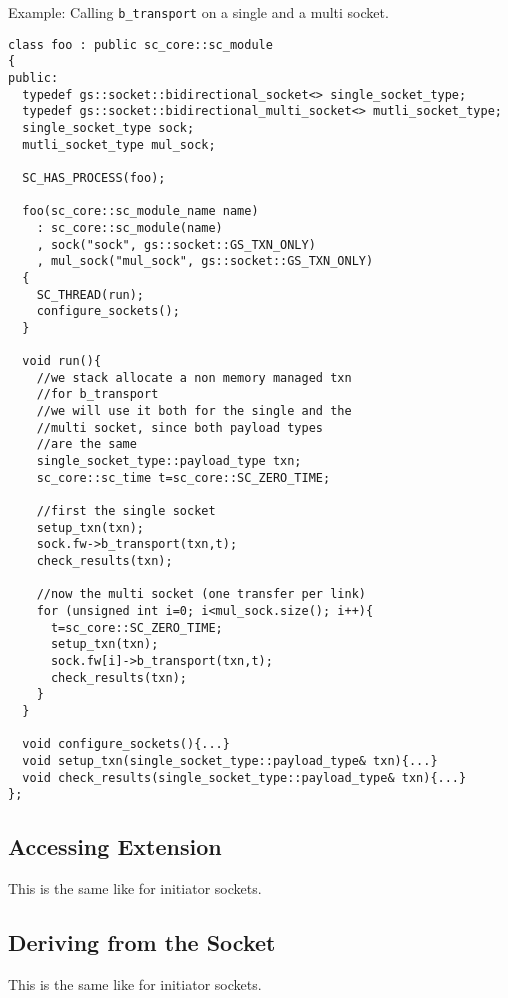 \documentclass[a4paper,10pt]{article}          %
\begin{document}
Example: Calling \verb|b_transport| on a single and a multi socket.

\begin{small}
\begin{verbatim}
class foo : public sc_core::sc_module
{
public:
  typedef gs::socket::bidirectional_socket<> single_socket_type;
  typedef gs::socket::bidirectional_multi_socket<> mutli_socket_type;
  single_socket_type sock;
  mutli_socket_type mul_sock;
  
  SC_HAS_PROCESS(foo);

  foo(sc_core::sc_module_name name)
    : sc_core::sc_module(name)
    , sock("sock", gs::socket::GS_TXN_ONLY)
    , mul_sock("mul_sock", gs::socket::GS_TXN_ONLY)
  {
    SC_THREAD(run);
    configure_sockets();
  }
  
  void run(){
    //we stack allocate a non memory managed txn
    //for b_transport
    //we will use it both for the single and the
    //multi socket, since both payload types 
    //are the same
    single_socket_type::payload_type txn;
    sc_core::sc_time t=sc_core::SC_ZERO_TIME;
    
    //first the single socket
    setup_txn(txn);
    sock.fw->b_transport(txn,t);
    check_results(txn);
    
    //now the multi socket (one transfer per link)
    for (unsigned int i=0; i<mul_sock.size(); i++){
      t=sc_core::SC_ZERO_TIME;
      setup_txn(txn);
      sock.fw[i]->b_transport(txn,t);
      check_results(txn);
    }
  }
  
  void configure_sockets(){...}
  void setup_txn(single_socket_type::payload_type& txn){...}
  void check_results(single_socket_type::payload_type& txn){...}
};
\end{verbatim}
\end{small}


\subsection{Accessing Extension}

This is the same like for initiator sockets.

\subsection{Deriving from the Socket}

This is the same like for initiator sockets.


\end{document}
